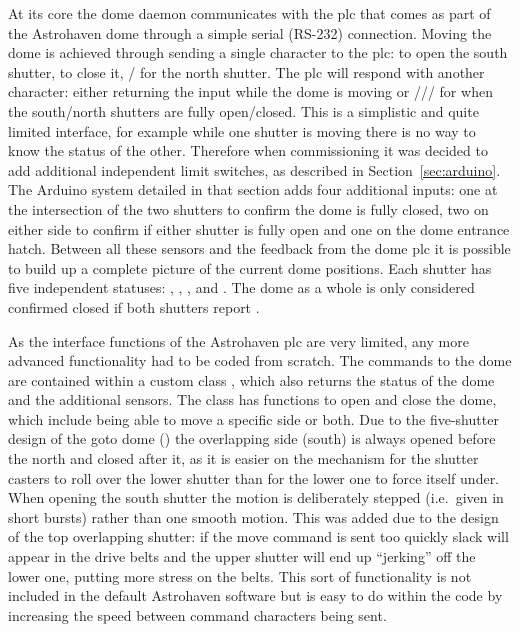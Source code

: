 \begin{colsection}
\begin{colsection}
At its core the dome daemon communicates with the \gls{plc} that comes as part of the Astrohaven dome through a simple serial (RS-232) connection. Moving the dome is achieved through sending a single character to the \gls{plc}:  to open the south shutter,  to close it, / for the north shutter. The \gls{plc} will respond with another character: either returning the input while the dome is moving or /// for when the south/north shutters are fully open/closed. This is a simplistic and quite limited interface, for example while one shutter is moving there is no way to know the status of the other. Therefore when commissioning it was decided to add additional independent limit switches, as described in Section~\ref{sec:arduino}. The Arduino system detailed in that section adds four additional inputs: one at the intersection of the two shutters to confirm the dome is fully closed, two on either side to confirm if either shutter is fully open and one on the dome entrance hatch. Between all these sensors and the feedback from the dome \gls{plc} it is possible to build up a complete picture of the current dome positions. Each shutter has five independent statuses: , , ,  and . The dome as a whole is only considered confirmed closed if both shutters report .

As the interface functions of the Astrohaven \gls{plc} are very limited, any more advanced functionality had to be coded from scratch. The commands to the dome are contained within a custom  class , which also returns the status of the dome and the additional sensors. The class has functions to open and close the dome, which include being able to move a specific side or both. Due to the five-shutter design of the \gls{goto} dome () the overlapping side (south) is always opened before the north and closed after it, as it is easier on the mechanism for the shutter casters to roll over the lower shutter than for the lower one to force itself under. When opening the south shutter the motion is deliberately stepped (i.e.\ given in short bursts) rather than one smooth motion. This was added due to the design of the top overlapping shutter: if the move command is sent too quickly slack will appear in the drive belts and the upper shutter will end up ``jerking'' off the lower one, putting more stress on the belts. This sort of functionality is not included in the default Astrohaven software but is easy to do within the  code by increasing the speed between command characters being sent.


\end{colsection}
\end{colsection}
